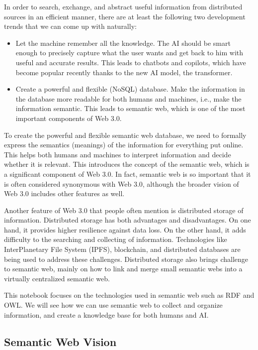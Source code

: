 In order to search, exchange, and abstract useful information from distributed sources in an efficient manner, there are at least the following two development trends that we can come up with naturally:
\begin{itemize}
  \item Let the machine remember all the knowledge. The AI should be smart enough to precisely capture what the user wants and get back to him with useful and accurate results. This leads to chatbots and copilots, which have become popular recently thanks to the new AI model, the transformer.
  \item Create a powerful and flexible (NoSQL) database. Make the information in the database more readable for both humans and machines, i.e., make the information semantic. This leads to semantic web, which is one of the most important components of Web 3.0.
\end{itemize}

To create the powerful and flexible semantic web database, we need to formally express the semantics (meanings) of the information for everything put online. This helps both humans and machines to interpret information and decide whether it is relevant. This introduces the concept of the semantic web, which is a significant component of Web 3.0. In fact, semantic web is so important that it is often considered synonymous with Web 3.0, although the broader vision of Web 3.0 includes other features as well.

Another feature of Web 3.0 that people often mention is distributed storage of information. Distributed storage has both advantages and disadvantages. On one hand, it provides higher resilience against data loss. On the other hand, it adds difficulty to the searching and collecting of information. Technologies like InterPlanetary File System (IPFS), blockchain, and distributed databases are being used to address these challenges. Distributed storage also brings challenge to semantic web, mainly on how to link and merge small semantic webs into a virtually centralized semantic web.

This notebook focuses on the technologies used in semantic web such as RDF and OWL. We will see how we can use semantic web to collect and organize information, and create a knowledge base for both humans and AI.

\subsection{Semantic Web Vision}

